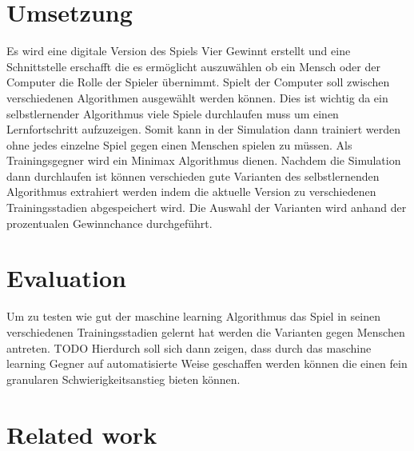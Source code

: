 \section{Umsetzung}

Es wird eine digitale Version des Spiels Vier Gewinnt erstellt und eine Schnittstelle erschafft die es ermöglicht auszuwählen ob ein Mensch oder der Computer die Rolle der Spieler übernimmt. Spielt der Computer soll zwischen verschiedenen Algorithmen ausgewählt werden können. Dies ist wichtig da ein selbstlernender Algorithmus viele Spiele durchlaufen muss um einen Lernfortschritt aufzuzeigen. Somit kann in der Simulation dann trainiert werden ohne jedes einzelne Spiel gegen einen Menschen spielen zu müssen. Als Trainingsgegner wird ein Minimax Algorithmus dienen. Nachdem die Simulation dann durchlaufen ist können verschieden gute Varianten des selbstlernenden Algorithmus extrahiert werden indem die aktuelle Version zu verschiedenen Trainingsstadien abgespeichert wird. Die Auswahl der Varianten wird anhand der prozentualen Gewinnchance durchgeführt. 

\section{Evaluation}
Um zu testen wie gut der maschine learning Algorithmus das Spiel in seinen verschiedenen Trainingsstadien gelernt hat werden die Varianten gegen Menschen antreten. 
TODO
Hierdurch soll sich dann zeigen, dass durch das maschine learning Gegner auf automatisierte Weise geschaffen werden können die einen fein granularen Schwierigkeitsanstieg bieten können.

\section{Related work}










